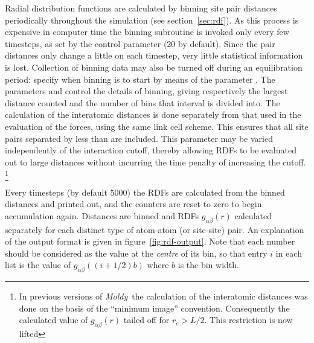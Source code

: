 \documentclass[a4paper,twoside]{report}
\newcommand{\moldy}{\emph{Moldy}}
\begin{document}
Radial distribution functions are calculated by binning site pair
distances periodically throughout the simulation (see
section~\ref{sec:rdf}).  As this process is expensive in computer time
the binning subroutine is invoked only every few timesteps, as set by
the control parameter  (20 by default).  Since
the pair distances only change a little on each timestep, very little
statistical information is lost.  Collection of binning data may also
be turned off during an equilibration period: specify when binning is
to start by means of the parameter .  The parameters
 and  control the details of binning,
giving respectively the largest distance counted and the number of
bins that interval is divided into. The calculation of the interatomic
distances is done separately from that used in the evaluation of the
forces, using the same link cell scheme.  This ensures that all site
pairs separated by less than  are included.  This
parameter may be varied independently of the interaction
cutoff, thereby allowing RDFs to be evaluated out to large distances
without incurring the time penalty of increasing the cutoff.%
\footnote{In previous versions of \moldy\ the calculation of the
  interatomic distances was done on the basis of the ``minimum image''
  convention.  Consequently the calculated value of
  $g_{\alpha\beta}(r)$ tailed off for $r_c > L/2$.  This restriction
  is now lifted}

Every  timesteps (by default 5000) the RDFs are
calculated from the binned distances and printed out, and the counters
are reset to zero to begin accumulation again.  Distances are binned
and RDFs $g_{\alpha \beta}(r)$ calculated separately for each distinct
type of atom-atom (or site-site) pair.  An explanation of the output
format is given in figure~\ref{fig:rdf-output}.  Note that each number
should be considered as the value at the \emph{centre} of its bin, so
that entry $i$ in each list is the value of
$g_{\alpha\beta}((i+1/2)b)$ where $b$ is the bin width.
\end{document}
